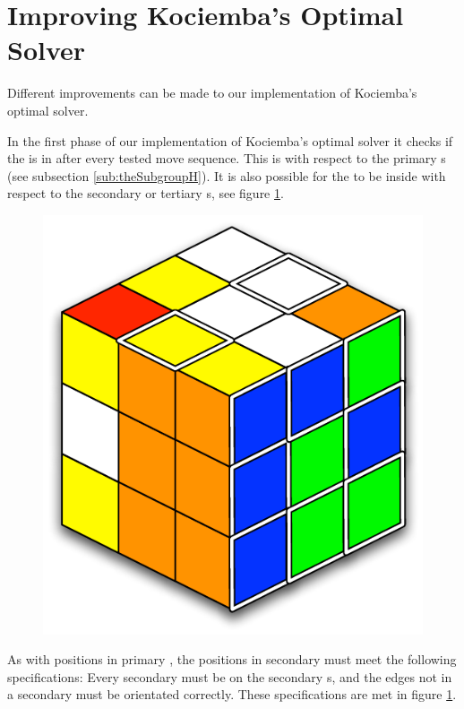 \section{Improving Kociemba's Optimal Solver}
Different improvements can be made to our implementation of Kociemba's optimal solver.
	
In the first phase of our implementation of Kociemba's optimal solver it checks if the \cube{} is in  after every tested move sequence.
This  is with respect to the primary \face{}s (see subsection \ref{sub:theSubgroupH}). 
It is also possible for the \rubik{} to be inside  with respect to the secondary or tertiary \face{}s, see figure \ref{fig:secondaryH}.

\begin{figure}[htb]
	\centering
	\includegraphics[scale=0.75]{input/pics/secondaryH.pdf}
	\caption{}
	\label{fig:secondaryH}
\end{figure}

As with positions in primary , the positions in secondary  must meet the following specifications:
Every secondary \facelet{} must be on the secondary \face{}s, and the edges not in a secondary \face{} must be orientated correctly.
These specifications are met in figure \ref{fig:secondaryH}.

